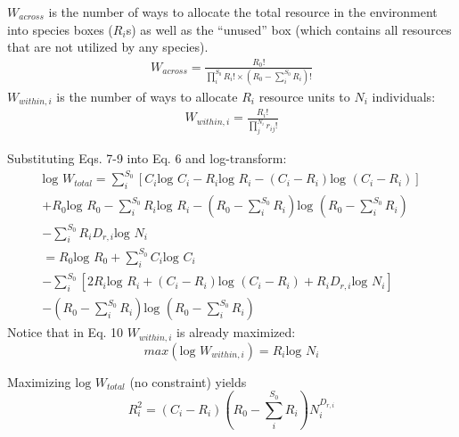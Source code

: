 \documentclass[12pt]{article}
\begin{document}
$W_{across}$ is the number of ways to allocate the total resource in the environment into species boxes ($R_i$s) as well as the ``unused'' box (which contains all resources that are not utilized by any species).
 \begin{equation}
 \begin{split}
W_{across} = \frac{R_0!}{\prod_i^{S_0}R_i! \times (R_0-\sum_i^{S_0}R_i)!}
\end{split}
\end{equation}
$W_{within,i}$ is the number of ways to allocate $R_i$ resource units to $N_i$ individuals:
 \begin{equation}
 \begin{split}
W_{within,i} = \frac{R_i!}{\prod_j^{N_i}r_{ij}! }
\end{split}
\end{equation}

 Substituting Eqs. 7-9 into Eq. 6 and log-transform:
  \begin{equation}
 \begin{split}
 \mbox{log }W_{total} = \sum^{S_0}_i [C_i \mbox{log } C_i - R_i \mbox{log } R_i - (C_i-R_i) \mbox{log } (C_i-R_i)] \\
 + R_0 \mbox{log } R_0 - \sum^{S_0}_i R_i\mbox{log } R_i - (R_0-\sum_i^{S_0}R_i) \mbox{log }(R_0-\sum_i^{S_0}R_i) \\
 - \sum^{S_0}_i R_i D_{r,i} \mbox{log } N_i\\
 = R_0 \mbox{log } R_0 + \sum^{S_0}_i C_i \mbox{log } C_i \\
 - \sum^{S_0}_i [2 R_i\mbox{log } R_i + (C_i-R_i) \mbox{log } (C_i-R_i)+ R_i D_{r,i} \mbox{log } N_i]\\
 - (R_0-\sum_i^{S_0}R_i) \mbox{log }(R_0-\sum_i^{S_0}R_i)
\end{split}
\end{equation}
Notice that in Eq. 10 $W_{within,i}$ is already maximized:
  \begin{equation}
max ( \mbox{log } W_{within,i}  )=  R_i \mbox{log } N_i
\end{equation}

Maximizing $ \mbox{log }W_{total}$ (no constraint) yields
  \begin{equation}
R_i^2 = (C_i-R_i)(R_0 -\sum_i^{S_0}R_i) N_i ^{D_{r,i}}
\end{equation}
\end{document}
